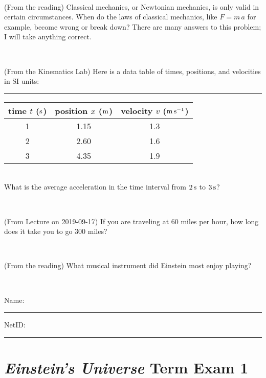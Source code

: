 \documentclass[12pt, letterpaper]{article}
\begin{document}
\vfill ~


\clearpage


\begin{problem} (From the reading)
Classical mechanics, or Newtonian mechanics, is only valid in certain
circumstances. When do the laws of classical mechanics, like $F =
m\,a$ for example, become wrong or break down? There are many answers
to this problem; I will take anything correct.
\end{problem}


\vfill ~

\begin{problem} (From the Kinematics Lab)
Here is a data table of times, positions, and velocities in SI units:\\
\rule{1.0in}{0pt}\begin{tabular}{c|c|c}
time $t$ ($\mathrm{s}$) & position $x$ ($\mathrm{m}$) & velocity $v$ ($\mathrm{m}\,\mathrm{s}^{-1}$) \\
\hline
1 & 1.15 & 1.3 \\
2 & 2.60 & 1.6 \\
3 & 4.35 & 1.9 \\
\hline
\end{tabular}\\
What is the average acceleration in the time interval from $2\,\mathrm{s}$ to $3\,\mathrm{s}$?
\end{problem}


\vfill ~

\begin{problem} (From Lecture on 2019-09-17)
If you are traveling at 60 miles per hour, how long does
it take you to go 300 miles?
\end{problem}


\vfill ~

\begin{problem} (From the reading)
What musical instrument did Einstein most enjoy playing?
\end{problem}


\vfill ~


\cleardoublepage



\noindent
Name: \rule[-1ex]{0.60\textwidth}{0.1pt}
NetID: \rule[-1ex]{0.20\textwidth}{0.1pt}

\section*{\textsl{Einstein's Universe} Term Exam 1}
\setcounter{problem}{1}
\end{document}
